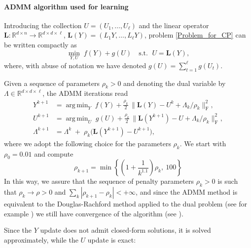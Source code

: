 \documentclass[onefignum,onetabnum]{siamonline250211}
\DeclareMathOperator*{\argmin}{arg\,min}
\begin{document}
\paragraph{ADMM algorithm used for learning}
Introducing the collection $U = (U_1,\dots,U_\ell)$ and the linear operator 
$\mathbf{L}: \mathbb{R}^{d\times n} \to \mathbb{R}^{d\times d\times \ell}$, 
$\mathbf{L}(Y) = (L_1 Y,\dots,L_\ell Y)$, 
problem \eqref{Problem_for_CP} can be written compactly as
\[
    \min_{Y,U} \; f(Y) + g(U) 
    \quad \text{s.t. } \; U = \mathbf{L}(Y),
\]
where, with abuse of notation we have denoted $g(U) = \sum_{t=1}^\ell g(U_t)$.

Given a sequence of parameters $\rho_k>0$ and denoting the dual variable by $\Lambda\in\mathbb{R}^{d\times d\times \ell}$, the ADMM iterations read
\begin{equation}\label{eq:ADMM-scaled}
    \begin{aligned}
    Y^{k+1}
        &= \argmin_{Y}\;
            f(Y) + \frac{\rho_k}{2}\,\big\|\mathbf{L}(Y)-U^{k}+\Lambda_k/\rho_k\big\|_{\mathrm F}^{2}, \\[0.5em]
    U^{k+1}
        &= \argmin_{U}\;
            g(U) + \frac{\rho_k}{2}\,\big\|\mathbf{L}(Y^{k+1})-U+\Lambda_k/\rho_k\big\|_{\mathrm F}^{2}, \\[0.5em]
    \Lambda^{k+1}
        &= \Lambda^{k} \;+\; \rho_k\big(\mathbf{L}(Y^{k+1})-U^{k+1}\big),
    \end{aligned}
\end{equation}
where we adopt the following choice for the parameters $\rho_k$. We start with $\rho_0=0.01$ and compute
\begin{equation}\label{eq:adaptive-rho}
    \rho_{k+1} = \min\left\{\left(1+\frac{1}{k^{1.1}}\right)\rho_k, \ 100\right\}
\end{equation}
In this way, we assure that the sequence of penalty parameters $\rho_k>0$ is such that $\rho_k \to \rho > 0 $ and $\sum_k |\rho_{k+1}-\rho_k|< +\infty$, and since the ADMM method is equivalent to the Douglas-Rachford method applied to the dual problem (see for example \cite{EcksteinBertsekas_DR}) we still have convergence of the algorithm (see \cite{Lorenz2024, Lorenz2019}).

Since the $Y$ update does not admit closed-form solutions, it is solved approximately, while the $U$ update is exact:
\end{document}
